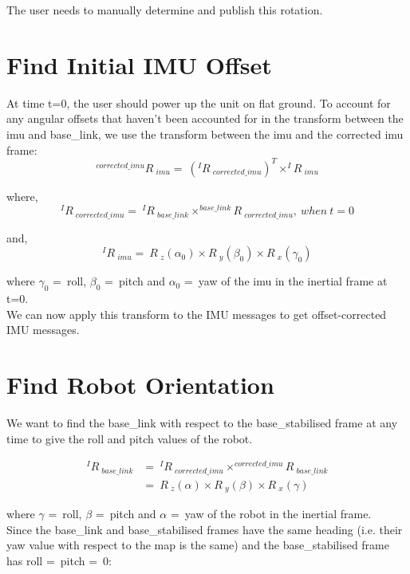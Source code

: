 \documentclass{article}
\begin{document}
The user needs to manually determine and publish this rotation.

\section{Find Initial IMU Offset}
At time t=0, the user should power up the unit on flat ground. To account for any angular offsets that haven't been accounted for in the transform between the imu and base\_link, we use the transform between the imu and the corrected imu frame:
\begin{equation}
^{corrected\_imu}R\ _{imu} =\ (^{I}R\ _{corrected\_imu})^T \times ^{I}R\ _{imu}
\end{equation}

where,
\begin{equation}
^{I}R\ _{corrected\_imu} =\ ^{I}R\ _{base\_link} \times ^{base\_link}R\ _{corrected\_imu},\ when\ t=0
\end{equation}

and,
\begin{equation}
^{I}R\ _{imu} =\ R\ _z(\alpha_0) \times R\ _y(\beta_0) \times R\ _x(\gamma_0) 
\end{equation}

where $\gamma_0$ =\ roll, $\beta_0$ =\ pitch and $\alpha_0$ =\ yaw of the imu in the inertial frame at t=0.\\

We can now apply this transform to the IMU messages to get offset-corrected IMU messages.

\section{Find Robot Orientation}
We want to find the base\_link with respect to the base\_stabilised frame at any time to give the roll and pitch values of the robot.

\begin{align}
^{I}R\ _{base\_link} & =\ ^{I}R\ _{corrected\_imu} \times ^{corrected\_imu}R\ _{base\_link}\\
 & =\ R\ _z(\alpha) \times R\ _y(\beta) \times R\ _x(\gamma) 
\end{align}

where $\gamma$ =\ roll, $\beta$ =\ pitch and $\alpha$ =\ yaw of the robot in the inertial frame.\\

Since the base\_link and base\_stabilised frames have the same heading (i.e. their yaw value with respect to the map is the same) and the base\_stabilised frame has roll =\ pitch =\ 0:
\end{document}
